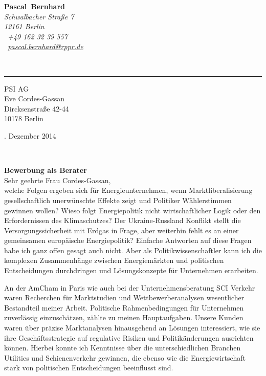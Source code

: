 \documentclass[11pt,a4paper]{article}
\def\firstname{Pascal}
\def\familyname{Bernhard}
\begin{document}
\sffamily   %
\hfill%
\begin{minipage}[t]{.6\textwidth}
	\raggedleft%
	{\bfseries {\color{firstnamecolor}\firstname}~{\color{familynamecolor}\familyname}}\\[.35ex]
	\small\itshape%
	Schwalbacher Straße 7\\
	12161 Berlin\\[.35ex]
	\Mobilefone~+49 162 32 39 557 \\
	\Letter~\href{mailto:pascal.bernhard@rppr.de}{pascal.bernhard@rppr.de}
\end{minipage}\\[0.5em]
%
{\color{firstnamecolor}\rule{\textwidth}{.25ex}}
%
\begin{minipage}[t]{.4\textwidth}
	\raggedright%
	\vspace*{1em}
	PSI AG \\
	Eve Cordes-Gassan\\[.35ex]
	\small%
	Dircksenstraße 42-44\\
	10178 Berlin
\end{minipage}
%
\hfill
%
\begin{minipage}[t]{.4\textwidth}
	. Dezember 2014
\end{minipage}\\[1em]
\raggedright

{\bfseries \color{familynamecolor}Bewerbung als Berater}\\[1.5em]

Sehr geehrte Frau Cordes-Gassan,\\[1em]
%
welche Folgen ergeben sich für Energieunternehmen, wenn Marktliberalisierung gesellschaftlich unerwünschte Effekte zeigt und Politiker Wählerstimmen gewinnen wollen? Wieso folgt Energiepolitik nicht wirtschaftlicher Logik oder den Erfordernissen des Klimaschutzes? Der Ukraine-Russland Konflikt stellt die Versorgungssicherheit mit Erdgas in Frage, aber weiterhin fehlt es an einer gemeinsamen europäische Energiepolitik? Einfache Antworten auf diese Fragen habe ich ganz offen gesagt auch nicht. Aber als Politikwissenschaftler kann ich die komplexen Zusammenhänge zwischen Energiemärkten und politischen Entscheidungen durchdringen und Lösungskonzepte für Unternehmen erarbeiten.

An der AmCham in Paris wie auch bei der Unternehmensberatung SCI Verkehr waren Recherchen für Marktstudien und Wettbewerberanalysen wesentlicher Bestandteil meiner Arbeit. Politische Rahmenbedingungen für Unternehmen zuverlässig einzuschätzen, zählte zu meinen Hauptaufgaben. Unsere Kunden waren über präzise Marktanalysen hinausgehend an Lösungen interessiert, wie sie ihre Geschäftsstrategie auf regulative Risiken und Politikänderungen ausrichten können. Hierbei konnte ich Kenntnisse über die unterschiedlichen Branchen Utilities und Schienenverkehr gewinnen, die ebenso wie die Energiewirtschaft stark von politischen Entscheidungen beeinflusst sind. 
\end{document}
